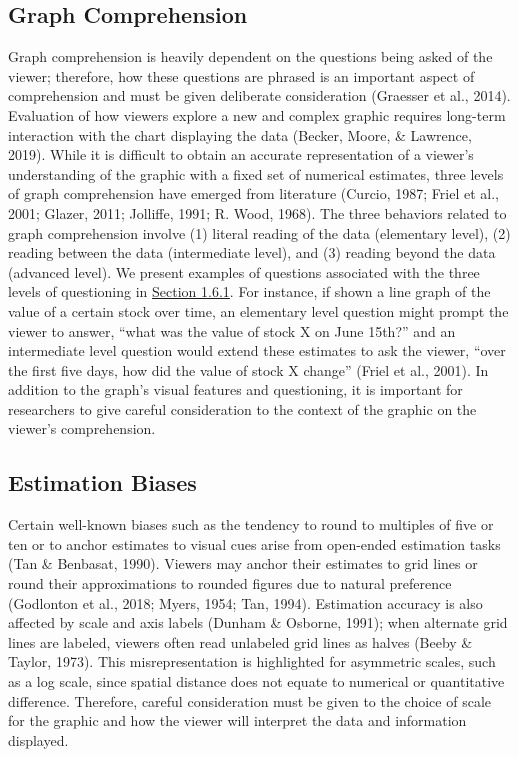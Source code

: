 \documentclass[print]{nuthesis}
\begin{document}
\hypertarget{graph-comprehension-1}{%
\subsection{Graph Comprehension}\label{graph-comprehension-1}}

Graph comprehension is heavily dependent on the questions being asked of the viewer; therefore, how these questions are phrased is an important aspect of comprehension and must be given deliberate consideration (Graesser et al., 2014).
Evaluation of how viewers explore a new and complex graphic requires long-term interaction with the chart displaying the data (Becker, Moore, \& Lawrence, 2019).
While it is difficult to obtain an accurate representation of a viewer's understanding of the graphic with a fixed set of numerical estimates, three levels of graph comprehension have emerged from literature (Curcio, 1987; Friel et al., 2001; Glazer, 2011; Jolliffe, 1991; R. Wood, 1968).
The three behaviors related to graph comprehension involve (1) literal reading of the data (elementary level), (2) reading between the data (intermediate level), and (3) reading beyond the data (advanced level).
We present examples of questions associated with the three levels of questioning in \protect\hyperlink{lit-questioning}{Section 1.6.1}.
For instance, if shown a line graph of the value of a certain stock over time, an elementary level question might prompt the viewer to answer, ``what was the value of stock X on June 15th?'' and an intermediate level question would extend these estimates to ask the viewer, ``over the first five days, how did the value of stock X change'' (Friel et al., 2001).
In addition to the graph's visual features and questioning, it is important for researchers to give careful consideration to the context of the graphic on the viewer's comprehension.

\hypertarget{estimation-biases-1}{%
\subsection{Estimation Biases}\label{estimation-biases-1}}

Certain well-known biases such as the tendency to round to multiples of five or ten or to anchor estimates to visual cues arise from open-ended estimation tasks (Tan \& Benbasat, 1990).
Viewers may anchor their estimates to grid lines or round their approximations to rounded figures due to natural preference (Godlonton et al., 2018; Myers, 1954; Tan, 1994).
Estimation accuracy is also affected by scale and axis labels (Dunham \& Osborne, 1991); when alternate grid lines are labeled, viewers often read unlabeled grid lines as halves (Beeby \& Taylor, 1973).
This misrepresentation is highlighted for asymmetric scales, such as a log scale, since spatial distance does not equate to numerical or quantitative difference.
Therefore, careful consideration must be given to the choice of scale for the graphic and how the viewer will interpret the data and information displayed.
\end{document}
